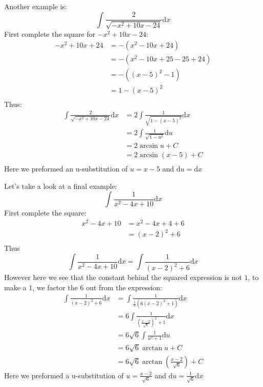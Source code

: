 \documentclass{article}
\numberwithin{equation}{section}
\begin{document}
Another example is:
\[
\int \frac{2}{\sqrt{-x^2 + 10x - 24}}\mathrm{d}x
\]
First complete the square for $-x^2 + 10 x -24$:
\begin{align*}
    -x^2 + 10x + 24 &= -(x^2 - 10x + 24)\\
    &= - (x^2 - 10x + 25 -25 + 24)\\
    &=-((x-5)^2 - 1)\\
    &= 1-(x-5)^2\\
\end{align*}
Thus:
\begin{align*}
    \int \frac{2}{\sqrt{-x^2 + 10x - 24}}\mathrm{d}x &= 2\int \frac{1}{\sqrt{1-(x-5)^2}} \mathrm{d}x\\
    &= 2\int \frac{1}{\sqrt{1-u^2}}\mathrm{d}u\\
    &= 2 \arcsin{u} + C\\
    &= 2\arcsin{(x-5)} +C\\
\end{align*}
Here we preformed an u-substitution of $u=x-5$ and $\mathrm{d}u = \mathrm{d}x$

Let's take a look at a final example:
\[
\int \frac{1}{x^2 - 4x + 10} \mathrm{d}x
\]
First complete the square:
\begin{align*}
    x^2 -4x + 10 &= x^2 - 4x + 4 + 6\\
    &=(x-2)^2 +6\\
\end{align*}
Thus
\[
\int \frac{1}{x^2 - 4x + 10} \mathrm{d}x = \int \frac{1}{(x-2)^2 +6} \mathrm{d}x
\]
However here we see that the constant behind the squared expression is not $1$, to make a $1$, we factor the $6$ out from the expression:
\begin{align*}
    \int \frac{1}{(x-2)^2 +6} \mathrm{d}x &= \int \frac{1}{\frac{1}{6}\left(6(x-2)^2 + 1\right)}\mathrm{d}x\\
    &= 6\int \frac{1}{\left(\frac{x-2}{\sqrt{6}}\right)^2 +1}\mathrm{d}x\\
    &= 6\sqrt{6} \int \frac{1}{u^2+1} \mathrm{d}u\\
    &= 6\sqrt{6} \arctan u +C\\
    &= 6\sqrt{6} \arctan \left(\frac{x-2}{\sqrt{6}}\right)+C
\end{align*}
Here we preformed a u-substitution of $\displaystyle u = \frac{x-2}{\sqrt{6}}$ and $\displaystyle \mathrm{d}u = \frac{1}{\sqrt{6}}\mathrm{d}x$
\end{document}
